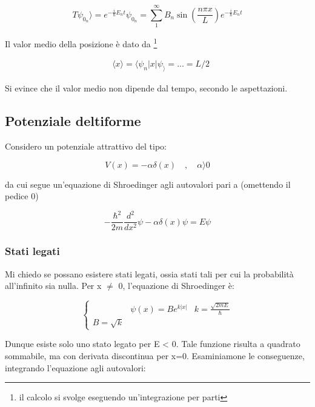 \documentclass{article}
\begin{document}
\begin{equation}
  T\psi_{0_n}\rangle = e^{-\frac{i}{\hbar}E_nt}\psi_{0_n}= \sum_{1}^{\infty} B_n \sin(\frac{n\pi x}{L})e^{-\frac{i}{\hbar}E_nt}
\end{equation}

Il valor medio della posizione è dato da \footnote{il calcolo si svolge eseguendo un'integrazione per parti}

\begin{equation}
  \begin{aligned}
     & \langle x\rangle =\langle \psi_n |x|\psi_\rangle =...=L/2
  \end{aligned}
\end{equation}

Si evince che il valor medio non dipende dal tempo, secondo le aspettazioni.

\subsection{Potenziale deltiforme}

Considero un potenziale attrattivo del tipo:

\begin{equation}
  V(x)= -\alpha \delta(x) \quad , \quad \alpha\rangle 0
\end{equation}

da cui segue un'equazione di Shroedinger agli autovalori pari a (omettendo il pedice 0)

\begin{equation}
  -\frac{\hbar^2}{2m}\frac{d^2}{dx^2}\psi-\alpha \delta(x)\psi=E\psi
\end{equation}

\subsubsection[short]{Stati legati}
Mi chiedo se possano esistere stati legati, ossia stati tali per cui la probabilità all'infinito sia nulla.
Per x $\neq$ 0, l'equazione di Shroedinger è:

\begin{equation}
  \left\{
  \begin{aligned}
     & \psi(x)=Be^{k|x|}
     & k=\frac{\sqrt{2mE}}{\hbar}
    \\ B= \sqrt{k}
  \end{aligned}
  \right.
\end{equation}

Dunque esiste solo uno stato legato per E < 0.
Tale funzione risulta a quadrato sommabile, ma con derivata discontinua per x=0. Esaminiamone le conseguenze, integrando
l'equazione agli autovalori:
\end{document}
